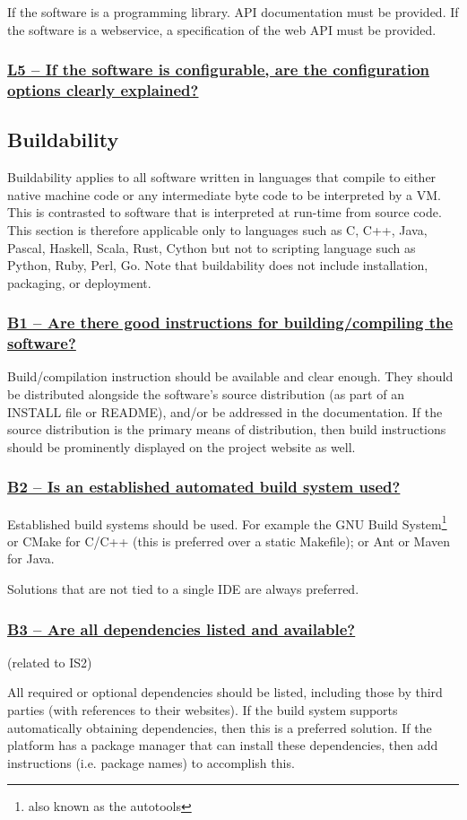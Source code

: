 \documentclass[a4paper,11pt]{article}
\newcommand{\criterion}[1]{\subsubsection*{\underline{#1}}}
\begin{document}
If the software is a programming library. API documentation must be provided.
If the software is a webservice, a specification of the web API must be provided.

\criterion{L5 -- If the software is configurable, are the configuration
options clearly explained?}


\subsection{Buildability}

Buildability applies to all software written in languages that compile to
either native machine code or any intermediate byte code to be interpreted by a VM.
This is contrasted to software that is interpreted at run-time from source
code. This section is therefore applicable only to languages such as C, C++,
Java, Pascal, Haskell, Scala, Rust, Cython but not to scripting language such
as Python, Ruby, Perl, Go.  Note that buildability does not include
installation, packaging, or deployment.

\criterion{B1 -- Are there good instructions for building/compiling the software?}

Build/compilation instruction should be available and clear enough. They should
be distributed alongside the software's source distribution (as part of an
INSTALL file or README), and/or be addressed in the documentation. If the
source distribution is the primary means of distribution, then build
instructions should be prominently displayed on the project website as well.

\criterion{B2 -- Is an established automated build system used?}

Established build systems should be used. For example the GNU Build
System\footnote{also known as the autotools} or CMake for C/C++ (this is
preferred over a static Makefile); or Ant or Maven for Java. 

Solutions that are not tied to a single IDE are always preferred.

\criterion{B3 -- Are all dependencies listed and available?}
(related to IS2)

All required or optional dependencies should be listed, including those by
third parties (with references to their websites). If the build system supports
automatically obtaining dependencies, then this is a preferred solution. If the
platform has a package manager that can install these dependencies, then add
instructions (i.e. package names) to accomplish this.
\end{document}

